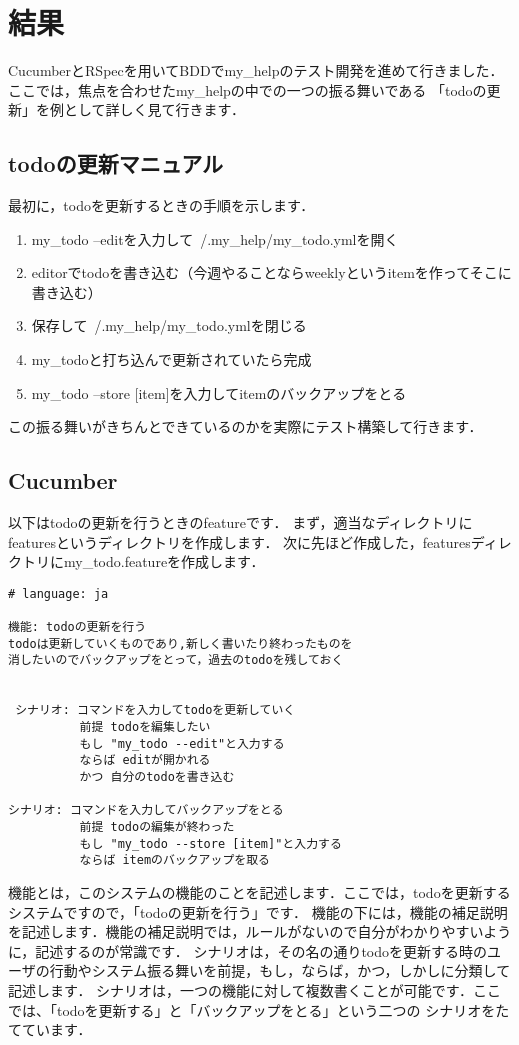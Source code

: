 
\section{結果}
CucumberとRSpecを用いてBDDでmy\_helpのテスト開発を進めて行きました．
ここでは，焦点を合わせたmy\_helpの中での一つの振る舞いである
「todoの更新」を例として詳しく見て行きます．

\subsection{todoの更新マニュアル}
最初に，todoを更新するときの手順を示します．

\begin{enumerate}
\item my\_todo --editを入力して~/.my\_help/my\_todo.ymlを開く
\item editorでtodoを書き込む（今週やることならweeklyというitemを作ってそこに書き込む）
\item 保存して~/.my\_help/my\_todo.ymlを閉じる
\item my\_todoと打ち込んで更新されていたら完成
\item my\_todo --store [item]を入力してitemのバックアップをとる
\end{enumerate}
この振る舞いがきちんとできているのかを実際にテスト構築して行きます．

\subsection{Cucumber}
以下はtodoの更新を行うときのfeatureです．
まず，適当なディレクトリにfeaturesというディレクトリを作成します．
次に先ほど作成した，featuresディレクトリにmy\_todo.featureを作成します．
\begin{lstlisting}[basicstyle=\scriptsize]
# language: ja 

機能: todoの更新を行う
todoは更新していくものであり,新しく書いたり終わったものを
消したいのでバックアップをとって，過去のtodoを残しておく


 シナリオ: コマンドを入力してtodoを更新していく
          前提 todoを編集したい
          もし "my_todo --edit"と入力する
          ならば editが開かれる
          かつ 自分のtodoを書き込む

シナリオ: コマンドを入力してバックアップをとる
          前提 todoの編集が終わった
          もし "my_todo --store [item]"と入力する
          ならば itemのバックアップを取る

\end{lstlisting}
機能とは，このシステムの機能のことを記述します．ここでは，todoを更新するシステムですので，「todoの更新を行う」です．
機能の下には，機能の補足説明を記述します．機能の補足説明では，ルールがないので自分がわかりやすいように，記述するのが常識です．
シナリオは，その名の通りtodoを更新する時のユーザの行動やシステム振る舞いを前提，もし，ならば，かつ，しかしに分類して記述します．
シナリオは，一つの機能に対して複数書くことが可能です．ここでは、「todoを更新する」と「バックアップをとる」という二つの
シナリオをたてています．

